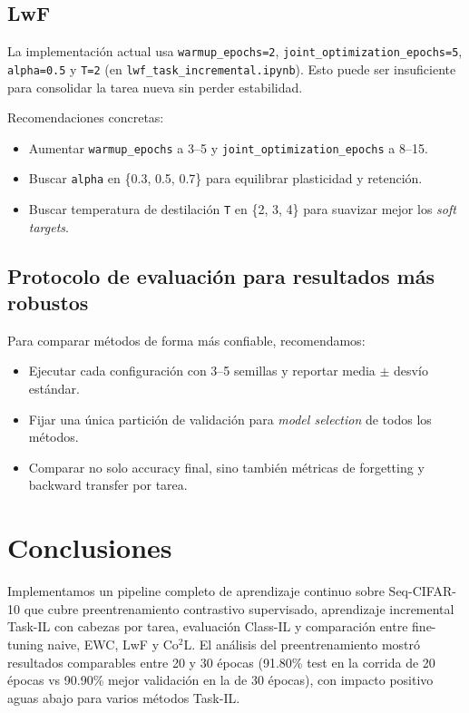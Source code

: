 \documentclass[10pt,a4paper]{article}
\begin{document}
\subsection{LwF}
La implementación actual usa \texttt{warmup\_epochs=2}, \texttt{joint\_optimization\_epochs=5}, \texttt{alpha=0.5} y \texttt{T=2} (en \texttt{lwf\_task\_incremental.ipynb}). Esto puede ser insuficiente para consolidar la tarea nueva sin perder estabilidad.

Recomendaciones concretas:
\begin{itemize}
	\item Aumentar \texttt{warmup\_epochs} a 3--5 y \texttt{joint\_optimization\_epochs} a 8--15.
	\item Buscar \texttt{alpha} en \{0.3, 0.5, 0.7\} para equilibrar plasticidad y retención.
	\item Buscar temperatura de destilación \texttt{T} en \{2, 3, 4\} para suavizar mejor los \textit{soft targets}.
\end{itemize}

\subsection{Protocolo de evaluación para resultados más robustos}
Para comparar métodos de forma más confiable, recomendamos:
\begin{itemize}
	\item Ejecutar cada configuración con 3--5 semillas y reportar media $\pm$ desvío estándar.
	\item Fijar una única partición de validación para \textit{model selection} de todos los métodos.
	\item Comparar no solo accuracy final, sino también métricas de forgetting y backward transfer por tarea.
\end{itemize}

\section{Conclusiones}

Implementamos un pipeline completo de aprendizaje continuo sobre Seq-CIFAR-10 que cubre preentrenamiento contrastivo supervisado, aprendizaje incremental Task-IL con cabezas por tarea, evaluación Class-IL y comparación entre fine-tuning naive, EWC, LwF y Co$^2$L. El análisis del preentrenamiento mostró resultados comparables entre 20 y 30 épocas (91.80\% test en la corrida de 20 épocas vs 90.90\% mejor validación en la de 30 épocas), con impacto positivo aguas abajo para varios métodos Task-IL.
\end{document}
